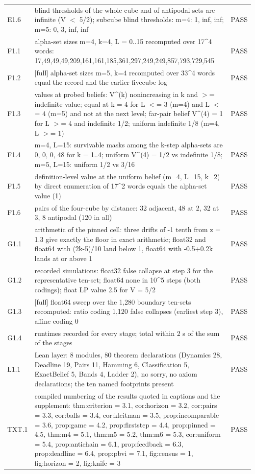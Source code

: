 \begin{longtable}{@{}l p{} l@{}}
E1.6 & blind thresholds of the whole cube and of antipodal sets are infinite (V $<$ 5/2); subcube blind thresholds: m=4: 1, inf, inf; m=5: 0, 3, inf, inf & PASS\\
F1.1 & alpha-set sizes m=4, k=4, L = 0..15 recomputed over 17\^{}4 words: 17,49,49,49,209,161,161,185,361,297,249,249,857,793,729,545 & PASS\\
F1.2 & [full] alpha-set sizes m=5, k=4 recomputed over 33\^{}4 words equal the record and the earlier fivecube log & PASS\\
F1.3 & values at probed beliefs: V\^{}(k) nonincreasing in k and $>$= indefinite value; equal at k = 4 for L $<$= 3 (m=4) and L $<$= 4 (m=5) and not at the next level; far-pair belief V\^{}(4) = 1 for L $>$= 4 and indefinite 1/2; uniform indefinite 1/8 (m=4, L $>$= 1) & PASS\\
F1.4 & m=4, L=15: survivable masks among the k-step alpha-sets are 0, 0, 0, 48 for k = 1..4; uniform V\^{}(4) = 1/2 vs indefinite 1/8; m=5, L=15: uniform 1/2 vs 3/16 & PASS\\
F1.5 & definition-level value at the uniform belief (m=4, L=15, k=2) by direct enumeration of 17\^{}2 words equals the alpha-set value (1) & PASS\\
F1.6 & pairs of the four-cube by distance: 32 adjacent, 48 at 2, 32 at 3, 8 antipodal (120 in all) & PASS\\
G1.1 & arithmetic of the pinned cell: three drifts of -1 tenth from z = 1.3 give exactly the floor in exact arithmetic; float32 and float64 with (2k-5)/10 land below 1, float64 with -0.5+0.2k lands at or above 1 & PASS\\
G1.2 & recorded simulations: float32 false collapse at step 3 for the representative ten-set; float64 none in 10\^{}5 steps (both codings); float LP value 2.5 for V = 5/2 & PASS\\
G1.3 & [full] float64 sweep over the 1,280 boundary ten-sets recomputed: ratio coding 1,120 false collapses (earliest step 3), affine coding 0 & PASS\\
G1.4 & runtimes recorded for every stage; total within 2 s of the sum of the stages & PASS\\
L1.1 & Lean layer: 8 modules, 80 theorem declarations (Dynamics 28, Deadline 19, Pairs 11, Hamming 6, Classification 5, ExactBelief 5, Bands 4, Ladder 2), no sorry, no axiom declarations; the ten named footprints present & PASS\\
TXT.1 & compiled numbering of the results quoted in captions and the supplement: thm:criterion = 3.1, cor:horizon = 3.2, cor:pairs = 3.3, cor:balls = 3.4, cor:kleitman = 3.5, prop:incomparable = 3.6, prop:game = 4.2, prop:firststep = 4.4, prop:pinned = 4.5, thm:m4 = 5.1, thm:m5 = 5.2, thm:m6 = 5.3, cor:uniform = 5.4, prop:antichain = 6.1, prop:feedback = 6.3, prop:deadline = 6.4, prop:pbvi = 7.1, fig:census = 1, fig:horizon = 2, fig:knife = 3 & PASS\\

\end{longtable}
